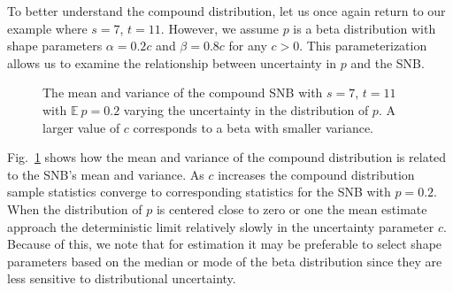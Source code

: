 \documentclass[review]{elsarticle}
\begin{document}
To better understand the compound distribution, let us once again return to 
our example where $s=7$, $t=11$. However, we assume $p$ is a beta distribution
with shape parameters $\alpha = 0.2 c$ and 
$\beta = 0.8 c$ for any $c > 0$.
This parameterization allows us to examine the relationship between 
uncertainty in $p$ and the SNB.

\begin{figure}[h!]
\centering
{}
\hfill
{}
\caption{
The mean and variance of the compound SNB with $s=7$, $t=11$
with $\mathbb{E}\ p = 0.2$ varying the uncertainty 
in the distribution of $p$. A larger value of $c$
corresponds to a beta with smaller variance.
}
\label{fig:bayesian-sample-size}
\end{figure}

Fig.~\ref{fig:bayesian-sample-size} shows how the mean
and variance of the compound distribution is related to the SNB's 
mean and variance. As $c$ increases the 
compound distribution sample statistics converge to corresponding 
statistics for the SNB with $p = 0.2$. 
When the distribution of $p$ is centered close to zero or one the mean 
estimate approach the deterministic limit relatively slowly in the uncertainty
parameter $c$.  Because of this, we note that for estimation it may be 
preferable to select shape parameters based on the median or mode of the 
beta distribution since they are less sensitive to distributional uncertainty.
\end{document}
